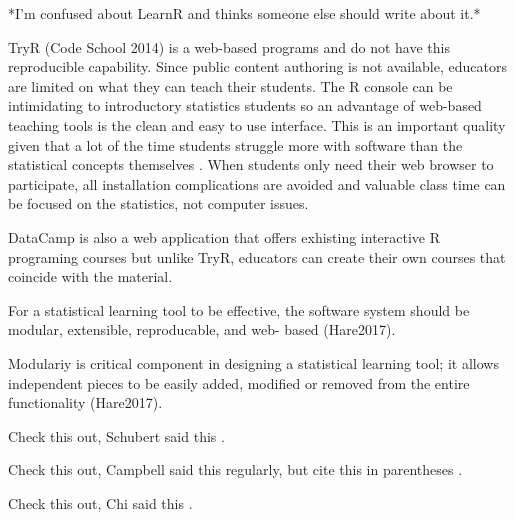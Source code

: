 \documentclass{tise_style}
\begin{document}
*I'm confused about LearnR and thinks someone else should write about it.*

TryR (Code School 2014) is a web-based programs and do not have this reproducible capability. Since public content authoring is not available, educators are limited on what they can teach their students. The R console can be intimidating to introductory statistics students so an advantage of web-based teaching tools is 
the clean and easy to use interface. This is an important quality given that a lot of the time students struggle more with 
software than the statistical concepts themselves \citep{Hare2017}. When students only need their web browser to participate,
all installation complications are avoided and valuable class time can be focused on the statistics, not computer issues.


DataCamp is also a web application that offers exhisting interactive R programing courses but unlike TryR, educators can 
create their own courses that coincide with the material. 


For a statistical learning tool to be effective, the software system should be modular, extensible, reproducable, and web-
based (Hare2017). 

Modulariy is critical component in designing a statistical learning tool; it allows independent pieces to be easily added, modified or removed from the entire functionality (Hare2017). 


Check this out, Schubert said this \cite{Schubert13}.


Check this out, Campbell said this \cite{Campbell02} regularly, but cite this in parentheses \citep{Campbell02}.


Check this out, Chi said this \cite{Chi81}.




\end{document}
